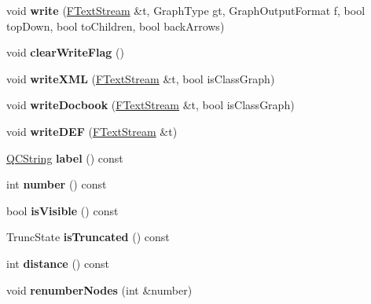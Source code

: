 \begin{DoxyCompactItemize}
void {\bfseries write} (\mbox{\hyperlink{class_f_text_stream}{F\+Text\+Stream}} \&t, Graph\+Type gt, Graph\+Output\+Format f, bool top\+Down, bool to\+Children, bool back\+Arrows)
\item 
\mbox{\label{class_dot_node_a27692f33c86a577ad85ab7176539d4de}} 
void {\bfseries clear\+Write\+Flag} ()
\item 
\mbox{\label{class_dot_node_a464ac9eb20e6e99d33113aada31850b3}} 
void {\bfseries write\+X\+ML} (\mbox{\hyperlink{class_f_text_stream}{F\+Text\+Stream}} \&t, bool is\+Class\+Graph)
\item 
\mbox{\label{class_dot_node_a41493056afa14c885fbd66b090ce6f91}} 
void {\bfseries write\+Docbook} (\mbox{\hyperlink{class_f_text_stream}{F\+Text\+Stream}} \&t, bool is\+Class\+Graph)
\item 
\mbox{\label{class_dot_node_ac3caa4673ba1c6325c1763985ceb4481}} 
void {\bfseries write\+D\+EF} (\mbox{\hyperlink{class_f_text_stream}{F\+Text\+Stream}} \&t)
\item 
\mbox{\label{class_dot_node_aead1705f4e6586bd7ba613fdda2e7241}} 
\mbox{\hyperlink{class_q_c_string}{Q\+C\+String}} {\bfseries label} () const
\item 
\mbox{\label{class_dot_node_a3c08a5ee367bbf4c58c719ff7f8e0fc7}} 
int {\bfseries number} () const
\item 
\mbox{\label{class_dot_node_a9e97a698e9e6460cd7fac782e38f0ce7}} 
bool {\bfseries is\+Visible} () const
\item 
\mbox{\label{class_dot_node_adcfb83215c88dcdd5c39391547e3882b}} 
Trunc\+State {\bfseries is\+Truncated} () const
\item 
\mbox{\label{class_dot_node_a196e6efc147272506e3e0564dfe47bfe}} 
int {\bfseries distance} () const
\item 
\mbox{\label{class_dot_node_a4e9da1f53e500d73aa8997ead79093fb}} 
void {\bfseries renumber\+Nodes} (int \&number)
\end{DoxyCompactItemize}
